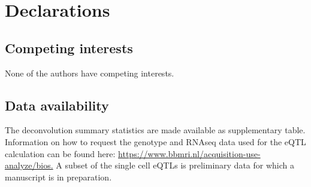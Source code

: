 \section{Declarations}
\subsection{Competing interests}
None of the authors have competing interests.
\subsection{Data availability}
The deconvolution summary statistics are made available as supplementary table. Information on how to request the genotype and RNAseq data used for the eQTL calculation can be found here: \url{https://www.bbmri.nl/acquisition-use-analyze/bios.} A subset of the single cell eQTLs is preliminary data for which a manuscript is in preparation.


\newpage

{\footnotesize
	}


\leftwatermark{}
\rightwatermark{}
